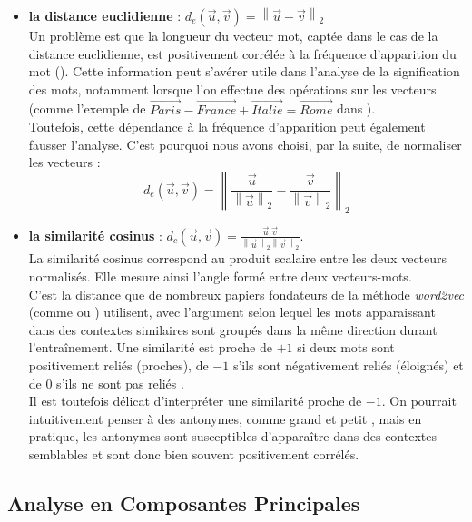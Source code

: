 \documentclass[11pt,french,french]{article}
\providecommand{\tightlist}{%
  \setlength{\parskip}{0pt}
  }
\begin{document}
\begin{itemize}
\tightlist
\item
  \textbf{la distance euclidienne} : \(d_{e}(\vec{u},\vec{v}) = \left\| \vec{u} - \vec{v} \right\|_2\)\\
  Un problème est que la longueur du vecteur mot, captée dans le cas de la distance euclidienne, est positivement corrélée à la fréquence d'apparition du mot (\cite{Schakel}). Cette information peut s'avérer utile dans l'analyse de la signification des mots, notamment lorsque l'on effectue des opérations sur les vecteurs (comme l'exemple de \(\overrightarrow{Paris} - \overrightarrow{France} + \overrightarrow{Italie} = \overrightarrow{Rome}\) dans \cite{Mikolov}).\\
  Toutefois, cette dépendance à la fréquence d'apparition peut également fausser l'analyse. C'est pourquoi nous avons choisi, par la suite, de normaliser les vecteurs :
  \[ d_{e}(\vec{u},\vec{v}) = \left\| \frac{\vec{u}}{\left\| \vec{u} \right\|_2} - \frac{\vec{v}}{\left\| \vec{v} \right\|_2}  \right\|_2\]
\item
  \textbf{la similarité cosinus} : \(d_{c}(\vec{u}, \vec{v}) = \frac{\vec{u}.\vec{v}}{\left\| \vec{u} \right\|_2 \left\| \vec{v} \right\|_2 }\).\\
  La similarité cosinus correspond au produit scalaire entre les deux vecteurs normalisés. Elle mesure ainsi l'angle formé entre deux vecteurs-mots.\\
  C'est la distance que de nombreux papiers fondateurs de la méthode \emph{word2vec} (comme \cite{Mikolov} ou \cite{Levy}) utilisent, avec l'argument selon lequel les mots apparaissant dans des contextes similaires sont groupés dans la même direction durant l'entraînement.
  Une similarité est proche de \(+1\) si deux mots sont positivement reliés (proches), de \(-1\) s'ils sont négativement reliés (éloignés) et de 0 s'ils ne sont pas \og reliés \fg{}.\\
  Il est toutefois délicat d'interpréter une similarité proche de \(-1\). On pourrait intuitivement penser à des antonymes, comme \og grand \fg{} et \og petit \fg{}, mais en pratique, les antonymes sont susceptibles d'apparaître dans des contextes semblables et sont donc bien souvent positivement corrélés.
\end{itemize}

\hypertarget{analyse-en-composantes-principales}{%
\subsection{Analyse en Composantes Principales}\label{analyse-en-composantes-principales}}
\end{document}
